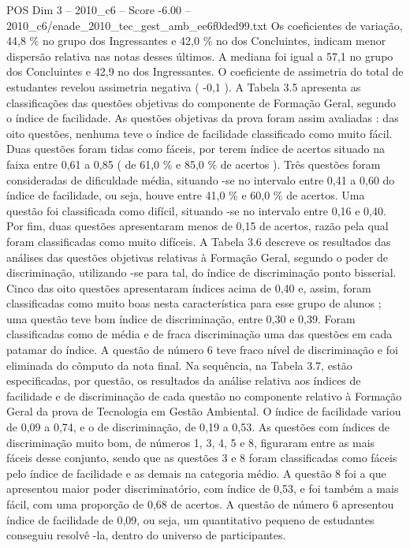 \begin{textsample}{POS Dim 3 – 2010\_c6 – Score -6.00 – 2010\_c6/enade\_2010\_tec\_gest\_amb\_ee6f0ded99.txt}
Os coeficientes de variação, 44,8 \% no grupo dos Ingressantes e 42,0 \% no dos Concluintes, indicam menor dispersão relativa nas notas desses últimos.
A mediana foi igual a 57,1 no grupo dos Concluintes e 42,9 no dos Ingressantes.
O coeficiente de assimetria do total de estudantes revelou assimetria negativa ( -0,1 ).
A Tabela 3.5 apresenta as classificações das questões objetivas do componente de Formação Geral, segundo o índice de facilidade.
As questões objetivas da prova foram assim avaliadas : das oito questões, nenhuma teve o índice de facilidade classificado como muito fácil.
Duas questões foram tidas como fáceis, por terem índice de acertos situado na faixa entre 0,61 a 0,85 ( de 61,0 \% e 85,0 \% de acertos ).
Três questões foram consideradas de dificuldade média, situando -se no intervalo entre 0,41 a 0,60 do índice de facilidade, ou seja, houve entre 41,0 \% e 60,0 \% de acertos.
Uma questão foi classificada como difícil, situando -se no intervalo entre 0,16 e 0,40.
Por fim, duas questões apresentaram menos de 0,15 de acertos, razão pela qual foram classificadas como muito difíceis.
A Tabela 3.6 descreve os resultados das análises das questões objetivas relativas à Formação Geral, segundo o poder de discriminação, utilizando -se para tal, do índice de discriminação ponto bisserial.
Cinco das oito questões apresentaram índices acima de 0,40 e, assim, foram classificadas como muito boas nesta característica para esse grupo de alunos ; uma questão teve bom índice de discriminação, entre 0,30 e 0,39.
Foram classificadas como de média e de fraca discriminação uma das questões em cada patamar do índice.
A questão de número 6 teve fraco nível de discriminação e foi eliminada do cômputo da nota final.
Na sequência, na Tabela 3.7, estão especificadas, por questão, os resultados da análise relativa aos índices de facilidade e de discriminação de cada questão no componente relativo à Formação Geral da prova de Tecnologia em Gestão Ambiental.
O índice de facilidade variou de 0,09 a 0,74, e o de discriminação, de 0,19 a 0,53.
As questões com índices de discriminação muito bom, de números 1, 3, 4, 5 e 8, figuraram entre as mais fáceis desse conjunto, sendo que as questões 3 e 8 foram classificadas como fáceis pelo índice de facilidade e as demais na categoria médio.
A questão 8 foi a que apresentou maior poder discriminatório, com índice de 0,53, e foi também a mais fácil, com uma proporção de 0,68 de acertos.
A questão de número 6 apresentou índice de facilidade de 0,09, ou seja, um quantitativo pequeno de estudantes conseguiu resolvê -la, dentro do universo de participantes.

\end{textsample}
